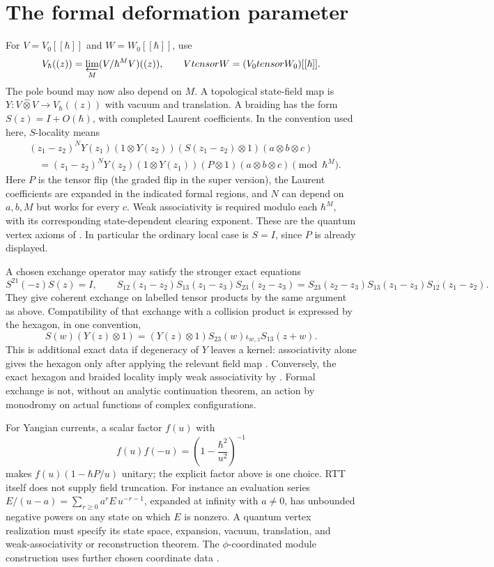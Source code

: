 \section{The formal deformation parameter}
For $V=V_0[[\hbar]]$ and $W=W_0[[\hbar]]$, use
\[
 V_\hbar((z))=\varprojlim_M(V/\hbar^MV)((z)),
 \qquad V\widehat\otimes W=(V_0\otimes W_0)[[\hbar]].
\]
The pole bound may now also depend on $M$.
A topological state-field map is
$Y:V\widehat\otimes V\to V_\hbar((z))$ with vacuum and translation.
A braiding has the form $S(z)=I+O(\hbar)$, with completed Laurent coefficients.
In the convention used here, $S$-locality means
\begin{equation}\label{eq:vol1-s-locality}
\begin{split}
 &(z_1-z_2)^N Y(z_1)(1\otimes Y(z_2))
       (S(z_1-z_2)\otimes1)(a\otimes b\otimes c)\\
 &\quad=(z_1-z_2)^N Y(z_2)(1\otimes Y(z_1))
       (P\otimes1)(a\otimes b\otimes c)\pmod{\hbar^M}.
\end{split}
\end{equation}
Here $P$ is the tensor flip (the graded flip in the super version), the Laurent coefficients are expanded in the indicated
formal regions, and $N$ can depend on $a,b,M$ but works for every $c$.
Weak associativity is required modulo each $\hbar^M$, with its corresponding
state-dependent clearing exponent.
These are the quantum vertex axioms of
\cite[Definitions~3.4, 3.5 and 3.12]{DSGKQVA}.
In particular the ordinary local case is $S=I$, since $P$ is already displayed.

A chosen exchange operator may satisfy the stronger exact equations
\[
 S^{21}(-z)S(z)=I,\qquad
 S_{12}(z_1-z_2)S_{13}(z_1-z_3)S_{23}(z_2-z_3)
 =S_{23}(z_2-z_3)S_{13}(z_1-z_3)S_{12}(z_1-z_2).
\]
They give coherent exchange on labelled tensor products by the same argument as
above. Compatibility of that exchange with a collision product is expressed by
the hexagon, in one convention,
\[
 S(w)(Y(z)\otimes1)
 =(Y(z)\otimes1)S_{23}(w)\iota_{w,z}S_{13}(z+w).
\]
This is additional exact data if degeneracy of $Y$ leaves a kernel:
associativity alone gives the hexagon only after applying the relevant field map
\cite[Proposition~3.14]{DSGKQVA}.
Conversely, the exact hexagon and braided locality imply weak associativity
by \cite[Proposition~3.13]{DSGKQVA}.
Formal exchange is not, without an analytic continuation theorem, an action by
monodromy on actual functions of complex configurations.

For Yangian currents, a scalar factor $f(u)$ with
\[
 f(u)f(-u)=\left(1-\frac{\hbar^2}{u^2}\right)^{-1}
\]
makes $f(u)(1-\hbar P/u)$ unitary; the explicit factor above is one choice.
RTT itself does not supply field truncation. For instance an evaluation series
$E/(u-a)=\sum_{r\ge0}a^rE\,u^{-r-1}$, expanded at infinity with $a\ne0$,
has unbounded negative powers on any state on which $E$ is nonzero.
A quantum vertex realization must specify its state space, expansion, vacuum,
translation, and weak-associativity or reconstruction theorem.
The $\phi$-coordinated module construction uses further chosen coordinate data
\cite{LiQVA}.

